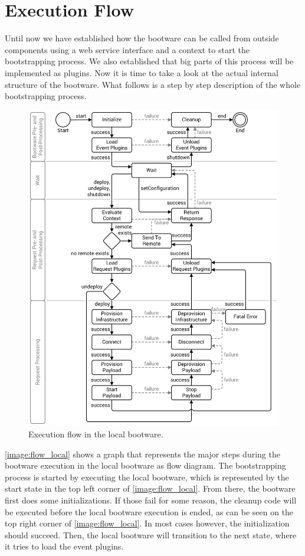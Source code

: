 \section{Execution Flow}
\label{design:flow}

Until now we have established how the bootware can be called from outside components using a web service interface and a context to start the bootstrapping process.
We also established that big parts of this process will be implemented as plugins.
Now it is time to take a look at the actual internal structure of the bootware.
What follows is a step by step description of the whole bootstrapping process.

\begin{figure}[!htbp]
	\centering
	\includegraphics[resolution=600]{design/assets/flow_local}
	\caption{Execution flow in the local bootware.}
	\label{image:flow_local}
\end{figure}

\autoref{image:flow_local} shows a graph that represents the major steps during the bootware execution in the local bootware as flow diagram.
The bootstrapping process is started by executing the local bootware, which is represented by the start state in the top left corner of \autoref{image:flow_local}.
From there, the bootware first does some initializations.
If those fail for some reason, the cleanup code will be executed before the local bootware execution is ended, as can be seen on the top right corner of \autoref{image:flow_local}.
In most cases however, the initialization should succeed.
Then, the local bootware will transition to the next state, where it tries to load the event plugins.

